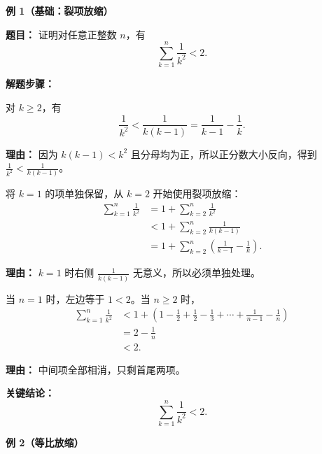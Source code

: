 \begin{examplebox}
	\textbf{\textcolor{CExample}{例 1（基础：裂项放缩）}}

	\textbf{\textcolor{CExample}{题目：}}
	证明对任意正整数 $n$，有
	\[
		\sum_{k=1}^n\frac1{k^2}<2.
	\]

	\textbf{\textcolor{CExample}{解题步骤：}}
	\begin{description}[style=nextline, leftmargin=2.8em, labelsep=0.5em, itemsep=0.45em]
		\item[\textbf{第一步（裂项放缩）：}]
		      对 $k\ge2$，有
		      \[
			      \frac1{k^2}<\frac1{k(k-1)}=\frac1{k-1}-\frac1k.
		      \]
		      \par\textbf{理由：} 因为 $k(k-1)<k^2$ 且分母均为正，所以正分数大小反向，得到 $\frac1{k^2}<\frac1{k(k-1)}$。

		\item[\textbf{第二步（分段求和）：}]
		      将 $k=1$ 的项单独保留，从 $k=2$ 开始使用裂项放缩：
		      \[
			      \begin{aligned}
				      \sum_{k=1}^n\frac1{k^2}
				       & =1+\sum_{k=2}^n\frac1{k^2}                       \\[2pt]
				       & <1+\sum_{k=2}^n\frac1{k(k-1)}                    \\[2pt]
				       & =1+\sum_{k=2}^n\left(\frac1{k-1}-\frac1k\right).
			      \end{aligned}
		      \]
		      \par\textbf{理由：} $k=1$ 时右侧 $\frac1{k(k-1)}$ 无意义，所以必须单独处理。

		\item[\textbf{第三步（裂项相消）：}]
		      当 $n=1$ 时，左边等于 $1<2$。当 $n\ge2$ 时，
		      \[
			      \begin{aligned}
				      \sum_{k=1}^n\frac1{k^2}
				       & <1+\left(1-\frac12+\frac12-\frac13+\cdots+\frac1{n-1}-\frac1n\right) \\[2pt]
				       & =2-\frac1n                                                           \\[2pt]
				       & <2.
			      \end{aligned}
		      \]
		      \par\textbf{理由：} 中间项全部相消，只剩首尾两项。
	\end{description}

	\textbf{\textcolor{CExample}{关键结论：}}
	\[
		\boxed{\displaystyle\sum_{k=1}^n\frac1{k^2}<2}.
	\]

	\medskip
	\textbf{\textcolor{CExample}{例 2（等比放缩）}}


\end{examplebox}
